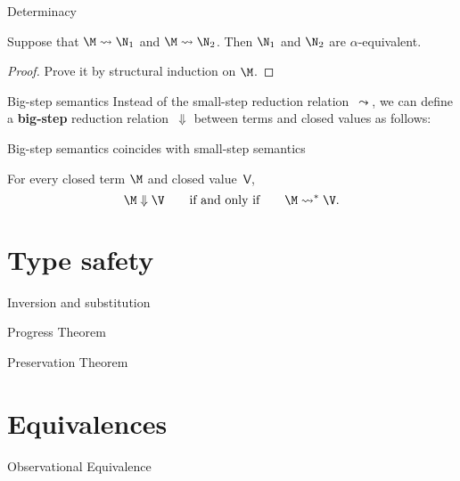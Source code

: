 \begin{frame}{Determinacy}
  \begin{theorem}
    Suppose that
    $\M \leadsto \N_1$ and $\M \leadsto \N_2$. Then $\N_1$ and $\N_2$
    are $\alpha$-equivalent. 
  \end{theorem}
  \begin{proof}
    Prove it by structural induction on $\M$. 
  \end{proof}
\end{frame}

\begin{frame}{Big-step semantics}
  Instead of the small-step reduction relation~$\leadsto$, we can define a
  \textbf{big-step} reduction relation~$\Downarrow$
  between terms and \alert{closed values} as follows: 
\end{frame}

\begin{frame}{Big-step semantics coincides with small-step semantics}
  \begin{theorem}
    For every closed term $\M$ and closed value~$\mathsf{V}$, 
    \[
      \M \Downarrow \V
      \qquad
      \text{if and only if}
      \qquad
      \M \leadsto^* \V. 
    \]
  \end{theorem}
\end{frame}

\section{Type safety}

\begin{frame}{Inversion and substitution}
\end{frame}

\begin{frame}
\end{frame}

\begin{frame}{Progress Theorem}
\end{frame}

\begin{frame}{Preservation Theorem}
\end{frame}

\section{Equivalences}

\begin{frame}{Observational Equivalence}
\end{frame}
